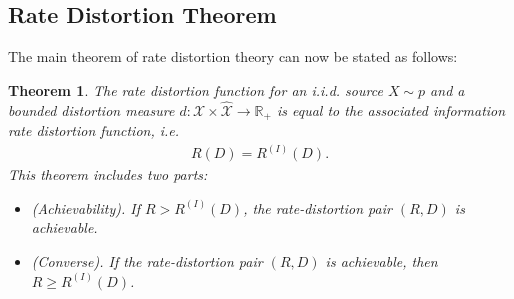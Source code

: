 \documentclass{article}
\numberwithin{equation}{section}
\newcommand{\bbR}{\mathbb{R}}
\renewcommand{\cal}{\mathcal}
\newcommand{\wh}{\widehat}
\theoremstyle{plain}
\newtheorem{theorem}{Theorem}[section]
\theoremstyle{definition}
\begin{document}
\subsection{Rate Distortion Theorem}
The main theorem of rate distortion theory can now be stated as follows:
\begin{theorem}\label{rdthm}
The rate distortion function for an i.i.d. source $X\sim p$ and a \textit{bounded} distortion measure $d:\cal{X}\times\wh{\cal{X}}\to\bbR_+$ is equal to the associated information rate distortion function, i.e.
\begin{align*}
	R(D)=R^{(I)}(D).
\end{align*}
This theorem includes two parts:
\begin{itemize}
	\item (Achievability). If $R>R^{(I)}(D)$, the rate-distortion pair $(R,D)$ is achievable.
	\item (Converse). If the rate-distortion pair $(R,D)$ is achievable, then $R\geq R^{(I)}(D)$.
\end{itemize}
\end{theorem}
\end{document}
